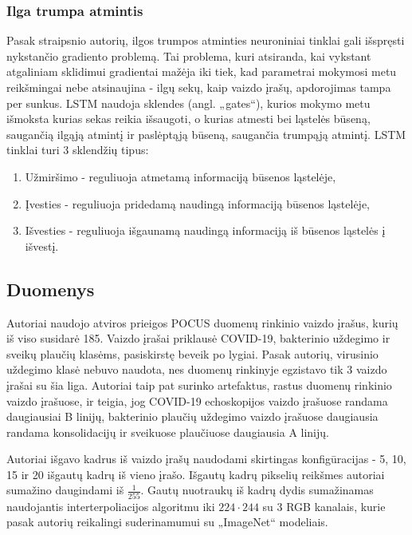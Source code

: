 \documentclass[fleqn]{VUMIFKompMagistrinis}
\begin{document}
\subsubsection{Ilga trumpa atmintis}\label{sec:lstm_sub}
Pasak straipsnio autorių, ilgos trumpos atminties neuroniniai tinklai gali išspręsti nykstančio gradiento problemą. Tai problema, kuri atsiranda, kai vykstant atgaliniam sklidimui gradientai mažėja iki tiek, kad parametrai mokymosi metu reikšmingai nebe atsinaujina - ilgų sekų, kaip vaizdo įrašų, apdorojimas tampa per sunkus. LSTM naudoja sklendes (angl. „gates“), kurios mokymo metu išmoksta kurias sekas reikia išsaugoti, o kurias atmesti bei ląstelės būseną, saugančią ilgąją atmintį ir paslėptąją būseną, saugančia trumpąją atmintį. LSTM tinklai turi 3 sklendžių tipus: 
\begin{enumerate}
    \item Užmiršimo - reguliuoja atmetamą informaciją būsenos ląstelėje,
    \item Įvesties - reguliuoja pridedamą naudingą informaciją būsenos ląstelėje,
    \item Išvesties - reguliuoja išgaunamą naudingą informaciją iš būsenos ląstelės į išvestį. 
\end{enumerate}

\subsection{Duomenys}\label{sec:duomenys}
Autoriai naudojo atviros prieigos POCUS duomenų rinkinio vaizdo įrašus, kurių iš viso susidarė 185. Vaizdo įrašai priklausė COVID-19, bakterinio uždegimo ir sveikų plaučių klasėms, pasiskirstę beveik po lygiai. Pasak autorių, virusinio uždegimo klasė nebuvo naudota, nes duomenų rinkinyje egzistavo tik 3 vaizdo įrašai su šia liga. Autoriai taip pat surinko artefaktus, rastus duomenų rinkinio vaizdo įrašuose, ir teigia, jog COVID-19 echoskopijos vaizdo įrašuose randama daugiausiai B linijų, bakterinio plaučių uždegimo vaizdo įrašuose daugiausia randama konsolidacijų ir sveikuose plaučiuose daugiausia A linijų.
\par
Autoriai išgavo kadrus iš vaizdo įrašų naudodami skirtingas konfigūracijas - 5, 10, 15 ir 20 išgautų kadrų iš vieno įrašo. Išgautų kadrų pikselių reikšmes autoriai sumažino daugindami iš \(\frac{1}{255}\). Gautų nuotraukų iš kadrų dydis sumažinamas naudojantis interterpoliacijos algoritmu iki \(224 \cdot 244\) su 3 RGB kanalais, kurie pasak autorių reikalingi suderinamumui su „ImageNet“ modeliais.
\end{document}
